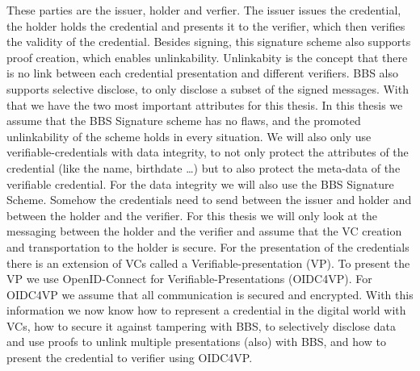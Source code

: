 \documentclass[
	a4paper               %
	,bibliography=totoc   %
	,listof=totoc         %
	,monolingual
	twoside=false,
]{bfhthesis}              %
\begin{document}
These parties are the issuer, holder and verfier.
The issuer issues the credential, the holder holds the credential and presents it to the verifier, which then verifies the validity of the credential.
Besides signing, this signature scheme also supports proof creation, which enables unlinkability.
Unlinkabity is the concept that there is no link between each credential presentation and different verifiers.
BBS also supports selective disclose, to only disclose a subset of the signed messages. With that we have the two most important attributes for this thesis.
In this thesis we assume that the BBS Signature scheme has no flaws, and the promoted unlinkability of the scheme holds in every situation.
We will also only use verifiable-credentials with data integrity, to not only protect the attributes of the credential (like the name, birthdate \dots) but to also protect the meta-data of the verifiable credential.
For the data integrity we will also use the BBS Signature Scheme.
Somehow the credentials need to send between the issuer and holder and between the holder and the verifier.
For this thesis we will only look at the messaging between the holder and the verifier and assume that the VC creation and transportation to the holder is secure.
For the presentation of the credentials there is an extension of VCs called a Verifiable-presentation (VP)\cite{verifiable-credentials}.
To present the VP we use OpenID-Connect for Verifiable-Presentations (OIDC4VP)\cite{oidc4vp}.
For OIDC4VP we assume that all communication is secured and encrypted.
With this information we now know how to represent a credential in the digital world with VCs, how to secure it against tampering with BBS, to selectively disclose data and use proofs to unlink multiple presentations (also) with BBS, and how to present the credential to verifier using OIDC4VP.


\newpage
\end{document}
